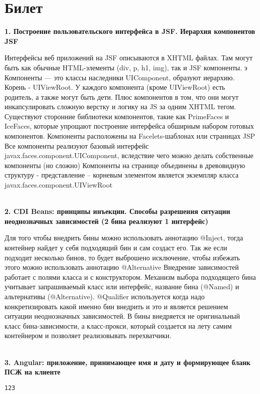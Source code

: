\documentclass{article}
\newcommand{\bil}[5]{%
        \section{Билет}
        \textbf{1. #1}

        #4
        \\
        \textbf{2. #2}
        
        #5
        \\
        \textbf{3. #3}
}
\begin{document}
\bil{Построение пользовательского интерфейса в JSF. Иерархия компонентов JSF}
{CDI Beans: принципы инъекции. Способы разрешения ситуации неоднозначных зависимостей (2 бина реализуют 1 интерфейс)}
{Angular: приложение, принимающее имя и дату и формирующее бланк ПСЖ на клиенте}{
    Интерфейсы веб приложений на JSF описываются в XHTML файлах. 
    Там могут быть как обычные HTML-элементы (div, p, h1, img), так и JSF компоненты. э
    Компоненты — это классы наследники UIComponent, образуют иерархию. 
    Корень - UIViewRoot. У каждого компонента (кроме UIViewRoot) есть родитель, а также могут быть дети. 
    Плюс компонентов в том, что они могут инкапсулировать сложную верстку и логику на JS за одним XHTML тегом. 
    Существуют сторонние библиотеки компонентов, такие как PrimeFaces и IceFaces, которые упрощают построение интерфейса обширным набором готовых компонентов. 
    Компоненты расположены на Facelets-шаблонах или страницах JSP 
    Все компоненты реализуют базовый интерфейс javax.faces.component.UIComponent, вследствие чего можно делать собственные компоненты (но сложно)
    Компоненты на странице объединены в древовидную структуру - представление – корневым элементом является экземпляр класса javax.faces.component.UIViewRoot
}{
    Для того чтобы внедрить бины можно использовать аннотацию @Inject, тогда контейнер найдет у себя подходящий бин и сам создаст его. 
    Так же если подходит несколько бинов, то будет выброшено исключение, чтобы избежать этого можно использовать аннотацию @Alternative Внедрение зависимостей работает с полями класса и с конструктором. 
    Механизм выбора подходящего бина учитывает запрашиваемый класс или интерфейс, название бина (@Named) и альтернативы (@Alternative). 
    @Qualifier используется когда надо конкретизировать какой именно бин внедрить и это и является решением ситуации неоднозначных зависимостей. В бины внедряется не оригинальный класс бина-зависимости, а класс-прокси, который создается на лету самим контейнером и позволяет реализовывать перехватчики.
}
\begin{lstlisting}[frame=single, basicstyle=\ttfamily, breaklines=true, breakatwhitespace=true, postbreak=\mbox{\textcolor{red}{$\hookrightarrow$}\space}]
123
\end{lstlisting}
\end{document}
